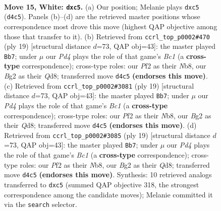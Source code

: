 \documentclass[11pt]{article}
\begin{document}
\clearpage

\begin{figure}[p]\centering
\begin{subfigure}{0.46\textwidth}\centering
\resizebox{\linewidth}{!}{%
\newchessgame
\chessboard[
  setfen={rnbqk2r/8/3b1np1/pppp1p2/3P4/6P1/PP2PPB1/RNBQNRK1 w kq - 0 15},
  showmover=false,
  pgfstyle=straightmove, color=movearrow, markmove={d4-c5}
]}
\caption{}
\end{subfigure}\hfill
\begin{subfigure}{0.46\textwidth}\centering
\resizebox{\linewidth}{!}{%
\newchessgame
\chessboard[
  setfen={rnbqkb1r/5ppp/4pn2/p7/2BP4/4PN1P/5PP1/RNBQK2R b KQkq - 0 10},
  showmover=false,
  pgfstyle=straightmove, color=movearrow, markmove={c8-b7}
]}
\caption{}
\end{subfigure}
\\[4pt]
\begin{subfigure}{0.46\textwidth}\centering
\resizebox{\linewidth}{!}{%
\newchessgame
\chessboard[
  setfen={rnbqkb1r/5ppp/4pn2/p7/2BP4/4PN1P/5PP1/RNBQK2R b KQkq - 0 10},
  showmover=false,
  pgfstyle=straightmove, color=movearrow, markmove={c8-b7}
]}
\caption{}
\end{subfigure}\hfill
\begin{subfigure}{0.46\textwidth}\centering
\resizebox{\linewidth}{!}{%
\newchessgame
\chessboard[
  setfen={rnbqkb1r/5ppp/4pn2/p7/2BP4/4PN1P/5PP1/RNBQK2R b KQkq - 0 10},
  showmover=false,
  pgfstyle=straightmove, color=movearrow, markmove={c8-b7}
]}
\caption{}
\end{subfigure}
\caption{\textbf{Move 15, White: \texttt{dxc5}.} (a) Our position; Melanie plays \texttt{dxc5} (\texttt{d4c5}). Panels (b)--(d) are the retrieved master positions whose correspondence most drove this move (highest QAP objective among those that transfer to it). (b) Retrieved from \texttt{ccrl\_top\_p0002\#470} (ply 19) [structural distance $d$=73, QAP obj=43]: the master played \texttt{Bb7}; under $\mu$ our \emph{Pd4} plays the role of that game's \emph{Bc1} (a \textbf{cross-type} correspondence); cross-type roles: our \emph{P}f2 as their \emph{N}b8, our \emph{B}g2 as their \emph{Q}d8; transferred move \texttt{d4c5} \textbf{(endorses this move)}. (c) Retrieved from \texttt{ccrl\_top\_p0002\#3081} (ply 19) [structural distance $d$=73, QAP obj=43]: the master played \texttt{Bb7}; under $\mu$ our \emph{Pd4} plays the role of that game's \emph{Bc1} (a \textbf{cross-type} correspondence); cross-type roles: our \emph{P}f2 as their \emph{N}b8, our \emph{B}g2 as their \emph{Q}d8; transferred move \texttt{d4c5} \textbf{(endorses this move)}. (d) Retrieved from \texttt{ccrl\_top\_p0002\#3085} (ply 19) [structural distance $d$=73, QAP obj=43]: the master played \texttt{Bb7}; under $\mu$ our \emph{Pd4} plays the role of that game's \emph{Bc1} (a \textbf{cross-type} correspondence); cross-type roles: our \emph{P}f2 as their \emph{N}b8, our \emph{B}g2 as their \emph{Q}d8; transferred move \texttt{d4c5} \textbf{(endorses this move)}. Synthesis: 10 retrieved analogs transferred to \texttt{dxc5} (summed QAP objective 318, the strongest correspondence among the candidate moves); Melanie committed it via the \texttt{search} selector.}
\label{fig:thought-m28}
\end{figure}
\end{document}
